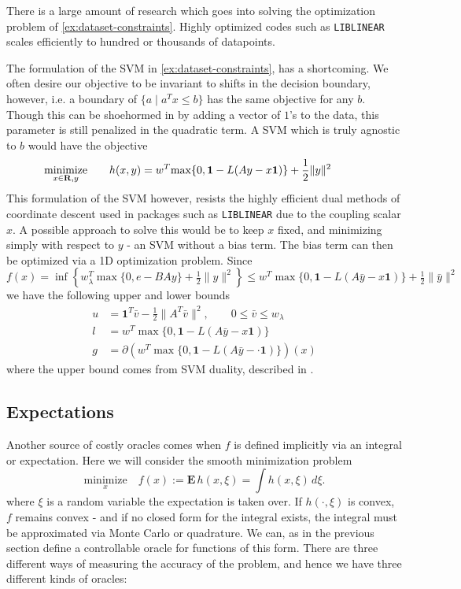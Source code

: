 \begin{example} There is a large amount of research
which goes into solving the optimization problem of \eqref{ex:dataset-constraints}.
Highly optimized codes such as {\tt LIBLINEAR} \cite{REF08a} scales efficiently to hundred or thousands of
datapoints. 

The formulation of the SVM in  \eqref{ex:dataset-constraints}, has a shortcoming.
We often desire our objective to be invariant to shifts in the
decision boundary, however, i.e. a boundary of $\{ a \mid a^Tx \leq b \}$ has the same
objective for any $b$. Though this can be shoehormed in by adding a vector of $1$'s to the data, 
this parameter is still penalized in the quadratic term. A SVM which is truly agnostic
to $b$ would have the objective
$$
\underset{x\in \mathbf{R} ,y}{\mbox{minimize}}\qquad h(x,y) = w^{T}\!\max\{0,\mathbf{1}-L(Ay - x\mathbf{1})\}+\frac{1}{2}\|y\|^{2}
\qquad \quad$$
This formulation of the SVM however, resists the highly efficient dual methods
of coordinate descent used in packages such as {\tt LIBLINEAR} \cite{REF08a}
due to the coupling scalar $x$. A possible approach to solve this
would be to keep $x$ fixed, and minimizing simply with respect to $y$ - an SVM
without a bias term. The bias term can then be optimized via a 1D optimization
problem. Since
$$
f(x)=\inf\left\{ w_{\lambda}^{T}\max\{0,e-BAy\}+\tfrac{1}{2}\|y\|^{2}\right\} \leq w^{T}\!\max\{0,\mathbf{1}-L(A\bar{y}-x\mathbf{1})\}+\tfrac{1}{2}\|\bar{y}\|^{2}
$$
we have the following upper and lower bounds
\begin{align*}
u & =\mathbf{1}^{T}\bar{v}-\tfrac{1}{2}\|A^{T}\bar{v}\|^{2},\qquad0\leq\bar{{v}}\leq w_{\lambda}\\
l & =w^{T}\!\max\{0,\mathbf{1}-L(A\bar{y}-x\mathbf{1})\}\\
g & =\partial(w^{T}\!\max\{0,\mathbf{1}-L(A\bar{y}-\cdot\mathbf{1})\})(x)
\end{align*}
where the upper bound comes from SVM duality, described in .

\end{example}
 

\subsection{Expectations}
Another source of costly oracles comes when $f$ is defined
implicitly via an integral or expectation. Here we will consider the smooth 
minimization problem
$$
\underset{x}{\mbox{minimize}}\quad f(x) :=\mathbf{E}\,h(x,\xi) = \int \! h(x,\xi) \,d\xi .
$$
where $\xi$ is a random variable the expectation is taken over. If $h(\cdot,
\xi)$ is convex, $f$ remains convex - and if no closed form for the integral
exists, the integral must be approximated via Monte Carlo or quadrature. We
can, as in the previous section define  a controllable oracle for functions of
this form. There are three different ways of measuring the accuracy of the problem,
and hence we have three different kinds of oracles:


